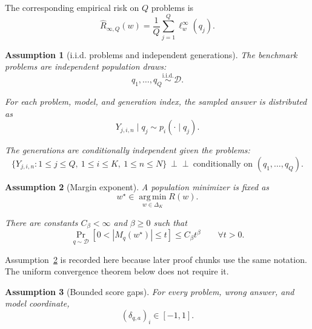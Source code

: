 \documentclass{article} %
\newtheorem{assumption}{Assumption}
\providecommand{\argmin}{\mathop{\mathrm{arg\,min}}\limits}
\providecommand{\D}{\mathcal{D}}
\providecommand{\simplex}{\Delta_K}
\providecommand{\Risk}{R}
\providecommand{\wstar}{w^{\star}}
\begin{document}
The corresponding empirical risk on \(Q\) problems is
\begin{equation}
\label{eq:app-erisk-exact}
\widehat{\Risk}_{\infty,Q}(w)
=
\frac{1}{Q}\sum_{j=1}^{Q}\ell_w^\infty(q_j).
\end{equation}

\begin{assumption}[i.i.d. problems and independent generations]
\label{ass:A1}
The benchmark problems are independent population draws:
\begin{equation}
\label{eq:A1-indep}
q_1,\ldots,q_Q \stackrel{\mathrm{i.i.d.}}{\sim} \D .
\end{equation}

For each problem, model, and generation index, the sampled answer is distributed as
\begin{equation}
\label{eq:A1-gen}
Y_{j,i,n}\mid q_j \sim p_i(\cdot\mid q_j).
\end{equation}

The generations are conditionally independent given the problems:
\begin{equation}
\label{eq:A1-cond}
\{Y_{j,i,n}:1\le j\le Q,\ 1\le i\le K,\ 1\le n\le N\}
\ \perp\!\!\!\perp\
\text{conditionally on } (q_1,\ldots,q_Q).
\end{equation}
\end{assumption}

\begin{assumption}[Margin exponent]
\label{ass:A2}
A population minimizer is fixed as
\begin{equation}
\label{eq:app-wstar}
\wstar \in \argmin_{w\in\simplex}\Risk(w).
\end{equation}

There are constants \(C_\beta<\infty\) and \(\beta\ge 0\) such that
\begin{equation}
\label{eq:A2}
\Pr_{q\sim\D}\!\left[0<|M_q(\wstar)|\le t\right]
\le
C_\beta t^\beta
\qquad
\forall t>0 .
\end{equation}
\end{assumption}

Assumption~\ref{ass:A2} is recorded here because later proof chunks use the same
notation. The uniform convergence theorem below does not require it.

\begin{assumption}[Bounded score gaps]
\label{ass:A3}
For every problem, wrong answer, and model coordinate,
\begin{equation}
\label{eq:A3}
(\delta_{q,a})_i\in[-1,1].
\end{equation}
\end{assumption}
\end{document}
